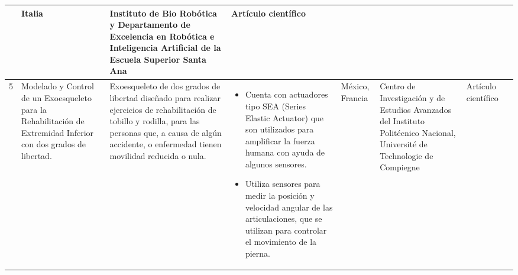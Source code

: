 \begin{table}[h!]
{{\begin{tabular}{|m{0.8cm}|m{2.5cm}|m{5cm}|m{7cm}|m{1.4cm}|m{4cm}|m{2cm}|m{0.5cm}|}
{\begin{itemize}
				\end{itemize}}             & {Italia}          & {Instituto de Bio   Robótica y Departamento de Excelencia en Robótica e Inteligencia Artificial   de la Escuela Superior Santa Ana}                           & {Artículo   científico}      & {\cite{08}}  \\ \hline
				{5} & {Modelado y Control   de un Exoesqueleto para la Rehabilitación de Extremidad Inferior con dos   grados de libertad.} & {Exoesqueleto de dos grados de libertad diseñado para   realizar ejercicios de rehabilitación de tobillo y rodilla, para las personas   que, a causa de algún accidente, o enfermedad tienen movilidad reducida o   nula.}                            & {\begin{itemize}
						\item Cuenta con actuadores tipo SEA (Series Elastic Actuator) que son utilizados para amplificar la fuerza humana con ayuda de algunos sensores.
						\item Utiliza sensores para medir la posición y velocidad angular de las articulaciones, que se utilizan para controlar el movimiento de la pierna.				
				\end{itemize}} & {México, Francia} &{Centro de Investigación y de Estudios Avanzados del   Instituto Politécnico Nacional, Université de Technologie de Compiegne}                                & {Artículo   científico}      & {\cite{09}} \\ \hline
	\end{tabular}}}
\end{table}
\clearpage
